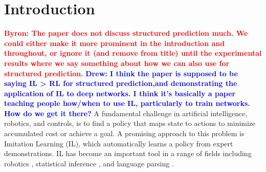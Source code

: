 \documentclass{article}
\newcommand{\BB}[1]{\textcolor{red}{\bf Byron: {#1}}}
\newcommand{\drew}[1]{\textcolor{blue}{\bf Drew: {#1}}}
\begin{document}
\begin{abstract}
Deep learning models are advancing the state of the art in structured prediction, but increasingly require training that goes beyond traditional supervised learning regimes. \cite{} Researchers have begun adopting reinforcement learning algorithms to train such structued predictors. We argue here that \textit{AggrevaTeD}-- a policy gradient extension of the Imitation Learning approach of \cite{Ross}-- leads to faster and better solutions with less training data then relying on less-informed RL techniques.  With both feedforward and recurrent neural predictors, we demonstrate stochastic gradient procedures to solve high dimensional continuous control problems as well as a partially observed dependency parsing task from raw image data. Backing our empirical findings, we provide a comprehensive theoretical study of IL that demonstrates we can expect \textit{exponentially} lower sample complexity for learning with \textit{AggrevateD} then with Reinforcement Learning algorithms. In both practice and in theory \drew{should we carefullly note this int he appendix since this has been a point of confusion for some folks?} we observe that the approach can achieve performance beyond that of the demonstrator when the demonstrator is sub-optimal. \drew{Needs some work. bb take pass.}
\end{abstract}



\section{Introduction}
\label{sec:intro}
\BB{The paper does not discuss structured prediction much. We could either make it more prominent in the introduction and throughout, or ignore it (and remove from title) until the experimental results where we say something about how we can also use for structured prediction.} \drew{I think the paper is supposed to be saying IL > RL for structured prediction,and demonstrating the application of IL to deep networks. I think it's basically a paper teaching people how/when to use IL, particularly to train networks. How do we get it there?} 
A fundamental challenge in artificial intelligence, robotics, and controls, is to find a policy that maps state to actions to minimize accumulated cost or achieve a goal. A promising approach to this problem is Imitation Learning (IL), which automatically learns a policy from expert demonstrations.  IL has become an important tool in a range of fields including robotics \cite{Ross2011_AISTATS}, statistical inference \cite{ross2011_CVPR,sun2016learning}, and language parsing \cite{chang2015learning_dependency}. 
\end{document}
